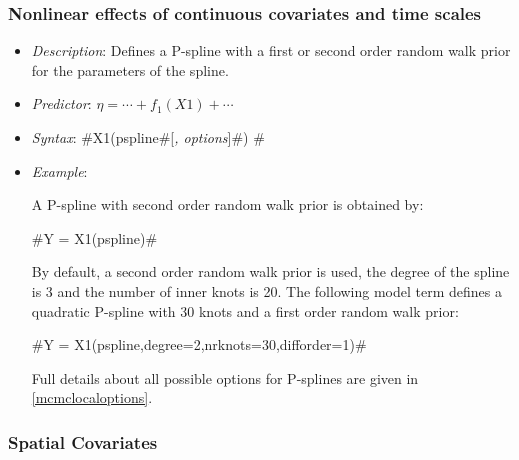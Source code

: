 

\subsubsection*{Nonlinear effects of continuous covariates and time scales}


\begin{itemize}
\item[] {\em Description}: Defines a P-spline with a first or
second order random walk prior for the parameters of the spline.

\item[] {\em Predictor}: $\eta =  \cdots + f_1(X1) + \cdots$

\item[] {\em Syntax}:
#X1(pspline#[{\em , options}]#) #

\item[] {\em Example}:

A P-spline with second order random walk prior is obtained by:

#Y = X1(pspline)#

By default, a second order random walk prior is used, the degree of the spline is 3 and the number of inner
knots is 20. The following model term defines a quadratic P-spline
with 30 knots and a first order random walk prior:

#Y = X1(pspline,degree=2,nrknots=30,difforder=1)#

Full details about all possible options for P-splines are given in
\autoref{mcmclocaloptions}.
\end{itemize}



\subsubsection*{Spatial Covariates}

